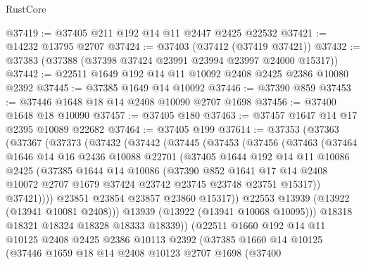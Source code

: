 \begin{lexlean}{RustCore}
\begin{coremodule}
@37419 := @37405 @211 @192 @14 @11 @2447 @2425 @22532
@37421 := @14232 @13795 @2707
@37424 := @37403 (@37412 (@37419 @37421))
@37432 := @37383 (@37388 (@37398 @37424 @23991 @23994 @23997 @24000 @15317))
@37442 := @22511 @1649 @192 @14 @11 @10092 @2408 @2425 @2386 @10080 @2392
@37445 := @37385 @1649 @14 @10092
@37446 := @37390 @859
@37453 := @37446 @1648 @18 @14 @2408 @10090 @2707 @1698
@37456 := @37400 @1648 @18 @10090
@37457 := @37405 @180
@37463 := @37457 @1647 @14 @17 @2395 @10089 @22682
@37464 := @37405 @199
@37614 := @37353
    (@37363
      (@37367
        (@37373
          (@37432
            (@37442
              (@37445
                (@37453
                  (@37456
                    (@37463
                      (@37464
                        @1646
                        @14
                        @16
                        @2436
                        @10088
                        @22701
                        (@37405
                          @1644
                          @192
                          @14
                          @11
                          @10086
                          @2425
                          (@37385
                            @1644
                            @14
                            @10086
                            (@37390
                              @852
                              @1641
                              @17
                              @14
                              @2408
                              @10072
                              @2707
                              @1679
                              @37424
                              @23742
                              @23745
                              @23748
                              @23751
                              @15317))
                          @37421))))
                  @23851
                  @23854
                  @23857
                  @23860
                  @15317))
              @22553
              @13939
              (@13922 (@13941 @10081 @2408)))
            @13939
            (@13922 (@13941 @10068 @10095)))
          @18318
          @18321
          @18324
          @18328
          @18333
          @18339))
      (@22511
        @1660
        @192
        @14
        @11
        @10125
        @2408
        @2425
        @2386
        @10113
        @2392
        (@37385
          @1660
          @14
          @10125
          (@37446
            @1659
            @18
            @14
            @2408
            @10123
            @2707
            @1698
            (@37400

\end{coremodule}
\end{lexlean}
